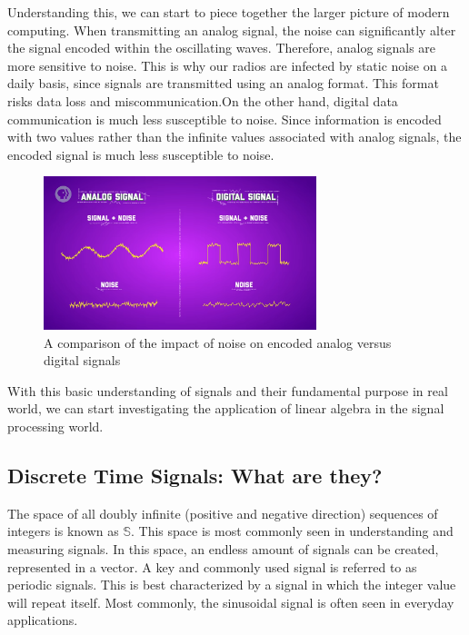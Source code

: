 \documentclass[11pt]{article}
\begin{document}
Understanding this, we can start to piece together the larger picture of modern computing. When transmitting an analog signal, the noise can significantly alter the signal encoded within the oscillating waves. Therefore, analog signals are more sensitive to noise. This is why our radios are infected by static noise on a daily basis, since signals are transmitted using an analog format. This format risks data loss and miscommunication.On the other hand, digital data communication is much less susceptible to noise. Since information is encoded with two values rather than the infinite values associated with analog signals, the encoded signal is much less susceptible to noise.

\begin{figure}[H]
    \begin{center}
    \includegraphics[width = 300px]{figures/singalAndNoise.png}
    \caption{A comparison of the impact of noise on encoded analog versus digital signals \cite{website:signalAndNoise}}
    \label{fig:singalAndNoise}
    \end{center} 
\end{figure}

With this basic understanding of signals and their fundamental purpose in real world, we can start investigating the application of linear algebra in the signal processing world.

\subsection{Discrete Time Signals: What are they?}

The space of all doubly infinite (positive and negative direction) sequences of integers is known as $\mathbb{S}$. This space is most commonly seen in understanding and measuring signals. In this space, an endless amount of signals can be created, represented in a vector. A key and commonly used signal is referred to as periodic signals. This is best characterized by a signal in which the integer value will repeat itself. Most commonly, the sinusoidal signal is often seen in everyday applications.
\end{document}

